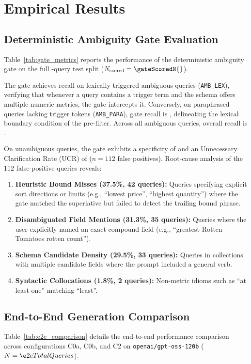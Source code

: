 \section{Empirical Results}
\label{sec:results}

\subsection{Deterministic Ambiguity Gate Evaluation}
Table~\ref{tab:gate_metrics} reports the performance of the deterministic ambiguity gate on the full \numTotalQueries{}-query test split ($N_{\text{scored}} = \gateScoredN{}$).



The gate achieves \gateRecallLexical{} recall on lexically triggered ambiguous queries (\texttt{AMB\_LEX}), verifying that whenever a query contains a trigger term and the schema offers multiple numeric metrics, the gate intercepts it. Conversely, on paraphrased queries lacking trigger tokens (\texttt{AMB\_PARA}), gate recall is \gateRecallParaphrase{}, delineating the lexical boundary condition of the pre-filter. Across all ambiguous queries, overall recall is \gateRecallOverall{}.

On unambiguous queries, the gate exhibits a specificity of \gateSpecificity{} and an Unnecessary Clarification Rate (UCR) of \gateUCR{} ($n = 112$ false positives). Root-cause analysis of the 112 false-positive queries reveals:
\begin{enumerate}
    \item \textbf{Heuristic Bound Misses (37.5\%, 42 queries):} Queries specifying explicit sort directions or limits (e.g., ``lowest price'', ``highest quantity'') where the gate matched the superlative but failed to detect the trailing bound phrase.
    \item \textbf{Disambiguated Field Mentions (31.3\%, 35 queries):} Queries where the user explicitly named an exact compound field (e.g., ``greatest Rotten Tomatoes rotten count'').
    \item \textbf{Schema Candidate Density (29.5\%, 33 queries):} Queries in collections with multiple candidate fields where the prompt included a general verb.
    \item \textbf{Syntactic Collocations (1.8\%, 2 queries):} Non-metric idioms such as ``at least one'' matching ``least''.
\end{enumerate}

\subsection{End-to-End Generation Comparison}
Table~\ref{tab:e2e_comparison} details the end-to-end performance comparison across configurations C0a, C0b, and C2 on \texttt{openai/gpt-oss-120b} ($N = \e2eTotalQueries{}$).


